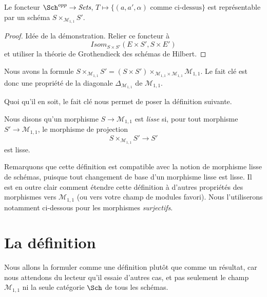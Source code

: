 \begin{lemma}
\label{lemma-key-fact}
Le foncteur $\Sch^{opp} \to \textit{Sets}$,
$T \mapsto \{(a, a', \alpha)\text{ comme ci-dessus}\}$
est représentable par un schéma $S \times_{\mathcal{M}_{1, 1}} S'$.
\end{lemma}

\begin{proof}
Idée de la démonstration. Relier ce foncteur à
$$
\mathit{Isom}_{S \times S'}(E \times S', S \times E')
$$
et utiliser la théorie de Grothendieck des schémas de Hilbert.
\end{proof}

\begin{remark}
\label{remark-diagonal}
Nous avons la formule
$S \times_{\mathcal{M}_{1, 1}} S' =
(S \times S')
\times_{\mathcal{M}_{1, 1} \times \mathcal{M}_{1, 1}}
\mathcal{M}_{1, 1}$.
Le fait clé est donc une propriété de la diagonale
$\Delta_{\mathcal{M}_{1, 1}}$ de $\mathcal{M}_{1, 1}$.
\end{remark}

\noindent
Quoi qu'il en soit, le fait clé nous permet de poser la définition suivante.

\begin{definition}
\label{definition-smooth}
Nous disons qu'un morphisme $S \to \mathcal{M}_{1, 1}$ est {\it lisse} si,
pour tout morphisme $S' \to \mathcal{M}_{1, 1}$, le morphisme de projection
$$
S \times_{\mathcal{M}_{1, 1}} S' \longrightarrow S'
$$
est lisse.
\end{definition}

\noindent
Remarquons que cette définition est compatible avec la notion de morphisme
lisse de schémas, puisque tout changement de base d'un morphisme lisse est
lisse. Il est en outre clair comment étendre cette définition à d'autres
propriétés des morphismes vers $\mathcal{M}_{1, 1}$ (ou vers votre champ de
modules favori). Nous l'utiliserons notamment ci-dessous pour les morphismes
{\it surjectifs}.





\section{La définition}
\label{section-definition}

\noindent
Nous allons la formuler comme une définition plutôt que comme un résultat,
car nous attendons du lecteur qu'il essaie d'autres cas, et pas seulement le
champ $\mathcal{M}_{1, 1}$ ni la seule catégorie $\Sch$ de tous les schémas.

